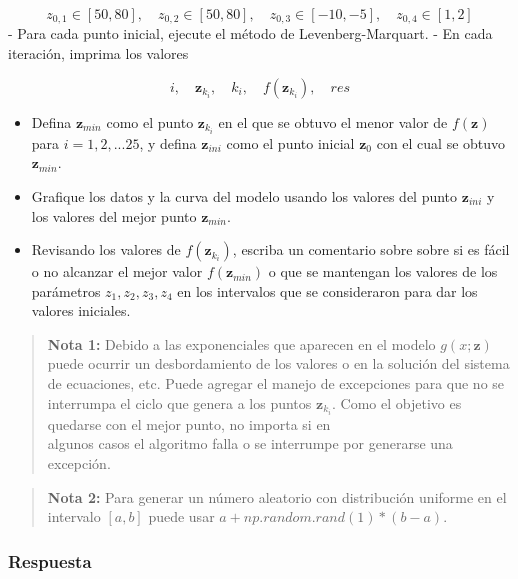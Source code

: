 \documentclass[11pt]{article}
\providecommand{\tightlist}{%
      \setlength{\itemsep}{0pt}\setlength{\parskip}{0pt}}
\begin{document}
\[ z_{0,1} \in [50, 80], \quad z_{0,2} \in [50, 80], 
\quad z_{0,3} \in [-10, -5], \quad  z_{0,4} \in [1, 2] \] - Para cada
punto inicial, ejecute el método de Levenberg-Marquart. - En cada
iteración, imprima los valores

\[i, \quad \mathbf{z}_{k_i}, \quad  k_i,  \quad  f(\mathbf{z}_{k_i}), \quad res\]

\begin{itemize}
\tightlist
\item
  Defina \(\mathbf{z}_{min}\) como el punto \(\mathbf{z}_{k_i}\) en el
  que se obtuvo el menor valor de \(f(\mathbf{z})\) para
  \(i=1,2,...25\), y defina \(\mathbf{z}_{ini}\) como el punto inicial
  \(\mathbf{z}_0\) con el cual se obtuvo \(\mathbf{z}_{min}\).
\item
  Grafique los datos y la curva del modelo usando los valores del punto
  \(\mathbf{z}_{ini}\) y los valores del mejor punto
  \(\mathbf{z}_{min}\).
\item
  Revisando los valores de \(f(\mathbf{z}_{k_i})\), escriba un
  comentario sobre sobre si es fácil o no alcanzar el mejor valor
  \(f(\mathbf{z}_{min})\) o que se mantengan los valores de los
  parámetros \(z_1, z_2, z_3, z_4\) en los intervalos que se
  consideraron para dar los valores iniciales.
\end{itemize}

\begin{quote}
\textbf{Nota 1:} Debido a las exponenciales que aparecen en el modelo
\(g(x; \mathbf{z})\) puede ocurrir un desbordamiento de los valores o en
la solución del sistema de ecuaciones, etc. Puede agregar el manejo de
excepciones para que no se interrumpa el ciclo que genera a los puntos
\(\mathbf{z}_{k_i}\). Como el objetivo es quedarse con el mejor punto,
no importa si en\\
algunos casos el algoritmo falla o se interrumpe por generarse una
excepción.
\end{quote}

\begin{quote}
\textbf{Nota 2:} Para generar un número aleatorio con distribución
uniforme en el intervalo \([a,b]\) puede usar
\(a + np.random.rand(1)*(b-a)\).
\end{quote}

    \hypertarget{respuesta}{%
\subsubsection{Respuesta}\label{respuesta}}
\end{document}
